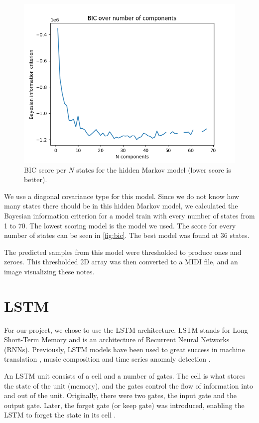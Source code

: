 \documentclass[11pt, twocolumn]{article}
\begin{document}
\begin{figure}
    \centering
    \includegraphics[width=\linewidth]{images/hmm_unfin_bic.png}
    \caption{BIC score per $N$ states for the hidden Markov model (lower score is better).}
    \label{fig:bic}
\end{figure}

We use a diagonal covariance type for this model. Since we do not know how many states there should be in this hidden Markov model, we calculated the Bayesian information criterion for a model train with every number of states from 1 to 70. The lowest scoring model is the model we used. The score for every number of states can be seen in \autoref{fig:bic}. The best model was found at 36 states.

The predicted samples from this model were thresholded to produce ones and zeroes. This thresholded 2D array was then converted to a MIDI file, and an image visualizing these notes. 

\section{LSTM}
For our project, we chose to use the LSTM architecture. LSTM stands for Long Short-Term Memory and is an architecture of Recurrent Neural Networks (RNNs). Previously, LSTM models have been used to great success in machine translation \cite{googleLSTMtranslation}, music composition \cite{Eck02learningthe} and time series anomaly detection \cite{malhotra2015long}.

An LSTM unit consists of a cell and a number of gates. The cell is what stores the state of the unit (memory), and the gates control the flow of information into and out of the unit. Originally, there were two gates, the input gate and the output gate. Later, the forget gate (or keep gate) was introduced, enabling the LSTM to forget the state in its cell \cite{LSTMSearchSpaceOdyssey}.
\end{document}
